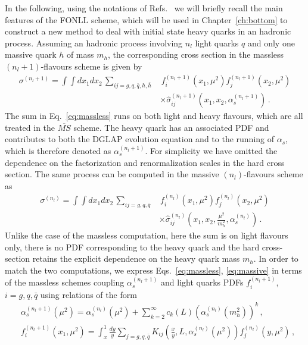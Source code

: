 %
In the following, using the notations of Refs.~\cite{Forte:2010ta,Forte:2015hba} we will briefly recall 
the main features of the FONLL scheme, which will be used in
Chapter~\ref{ch:bottom} to construct a new method to deal with initial state heavy quarks in an hadronic process.
Assuming an hadronic process involving $n_l$ light quarks $q$  and only one massive quark $h$ of mass $m_h$,
the corresponding cross section in the massless $(n_l+1)$-flavours scheme is given by
\begin{align}
    \label{eq:massless}
    \sigma^{(n_l+1)} = \int \int dx_1 dx_2\, \sum_{ij=g,q,\bar{q},h,\bar{h}}&\, 
    f_i^{(n_l+1)}\left(x_1,\mu^2\right)f_j^{(n_l+1)}\left(x_2,\mu^2\right) \nonumber \\
    &\times\hat{\sigma}^{(n_l+1)}_{ij}\left(x_1,x_2,\alpha_s^{(n_l+1)}\right)\,.
\end{align}
The sum in Eq.~\eqref{eq:massless} runs on both light and heavy flavours, which are all treated in the
$\overline{MS}$ scheme. The heavy quark has an associated PDF and contributes to both the
DGLAP evolution equation and to the running of $\alpha_s$, which is therefore denoted as $\alpha_s^{(n_l+1)}$. 
For simplicity we have omitted the
dependence on the factorization and renormalization scales in the hard cross section.
The same process can be computed in the massive $(n_l)$-flavours scheme as
\begin{align}
    \label{eq:massive}
    \sigma^{(n_l)} = \int \int dx_1 dx_2\, \sum_{ij=g,q,\bar{q}}&\, 
    f_i^{(n_l)}\left(x_1,\mu^2\right)f_j^{(n_l)}\left(x_2,\mu^2\right) \nonumber \\
    &\times\hat{\sigma}^{(n_l)}_{ij}\left(x_1,x_2,\frac{\mu^2}{m_h^2},\alpha_s^{(n_l)}\right)\,.
\end{align}
Unlike the case of the massless computation, here the sum is on light flavours only, there is no PDF corresponding
to the heavy quark and the hard cross-section retains the explicit dependence on the heavy quark mass $m_h$.
In order to match the two computations, we express Eqs.~\eqref{eq:massless}, \eqref{eq:massive} in terms of 
the massless schemes coupling $\alpha_s^{(n_l+1)}$ and light quarks PDFs $f^{(n_l+1)}_i$,
$i = g,q,\bar{q}$ using relations of the form
\begin{align}
    \label{eq:matching_alpha}
    &\alpha_s^{(n_l+1)}\left(\mu^2\right) = 
    \alpha_s^{(n_l)}\left(\mu^2\right) 
    + \sum_{k=2}^{\infty} c_k\left(L\right) \left(\alpha_s^{(n_l)}\left(m_h^2\right)\right)^k\,, \\
    \label{eq:matching_PDFs}
    &f_i^{(n_l+1)}\left(x_1,\mu^2\right) = \int_x^1 \frac{dy}{y} 
    \sum_{j=g,q,\bar{q}} K_{ij}\left(\frac{x}{y}, L, \alpha_s^{(n_l)}\left(\mu^2\right)\right) f_j^{(n_l)}\left(y,\mu^2\right)\,,
\end{align}
